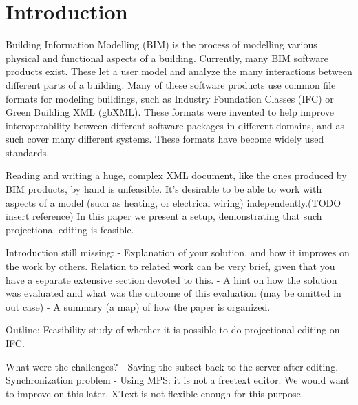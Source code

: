 


\setcounter{page}{1}
\section{Introduction}
Building Information Modelling (BIM) is the process of modelling various physical and functional aspects of a building\cite{clar:eke}. Currently, many BIM software products exist. These let a user model and analyze the many interactions between different parts of a building. Many of these software products use common file formats for modeling buildings, such as Industry Foundation Classes (IFC) or Green Building XML (gbXML). These formats were invented to help improve interoperability between different software packages in different domains, and as such cover many different systems. These formats have become widely used standards.

Reading and writing a huge, complex XML document, like the ones produced by BIM products, by hand is unfeasible. It’s desirable to be able to work with aspects of a model (such as heating, or electrical wiring) independently.(TODO insert reference) In this paper we present a setup, demonstrating that such projectional editing is feasible.

Introduction still missing:
- Explanation of your solution, and how it improves on the work by others. Relation to related work can be very brief, given that you have a separate extensive section devoted to this.
- A hint on how the solution was evaluated and what was the outcome of this evaluation (may be omitted in out case)
- A summary (a map) of how the paper is organized.



Outline:
Feasibility study of whether it is possible to do projectional editing on IFC.

What were the challenges?
- Saving the subset back to the server after editing. Synchronization problem
- Using MPS: it is not a freetext editor. We would want to improve on this later. XText is not flexible enough for this purpose.

